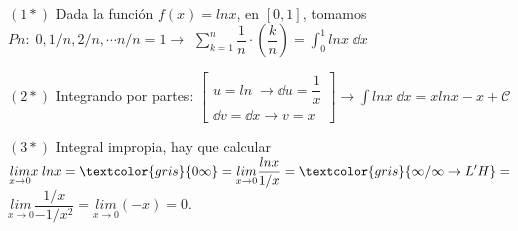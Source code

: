 $\quad$

\small{$(1*)$} Dada la función $f(x)=ln x$, en $[0,1]$, tomamos $Pn:\; 0, 1/n, 2/n, \cdots n/n=1 \to$
$ \displaystyle \sum_{k=1}^n \dfrac 1 n \cdot \left( \dfrac k n \right) = \int_0^1 lnx\; \dd x$

$(2*)$ Integrando por partes: $\left[ \begin{matrix} u=ln\; \to \dd u= \dfrac 1 x \\ \dd v = \dd x \to v=x  \end{matrix} \right] \to \displaystyle \int ln x \; \dd x = xln x-x+\mathcal C$

$(3*)$ Integral impropia, hay que calcular $\displaystyle \underset {x\to 0}{lim} x\; ln x =\textcolor{gris}{0\infty}=\underset {x\to 0}{lim} \dfrac {ln x}{1/x}=\textcolor{gris}{\infty / \infty \to L'H}= $ 
$\displaystyle \underset {x\to 0}{lim} \dfrac {1/x}{-1/x^2}=\underset {x\to 0}{lim} (-x)=0$\normalsize{.}


	

	
